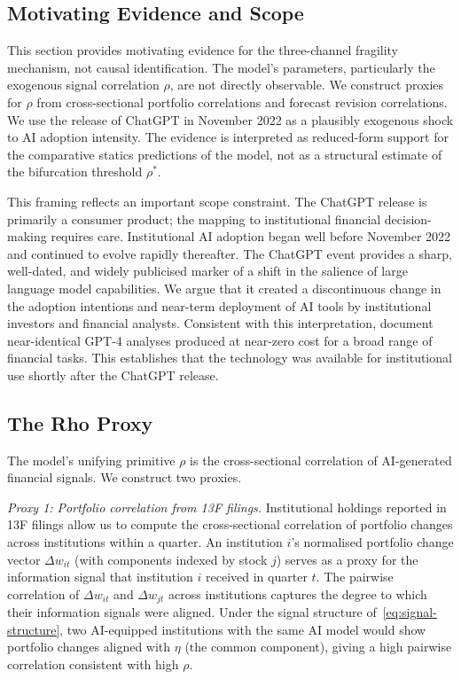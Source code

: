 \label{sec:empirics}

\subsection{Motivating Evidence and Scope}

This section provides motivating evidence for the three-channel fragility mechanism, not causal identification. The model's parameters, particularly the exogenous signal correlation $\rho$, are not directly observable. We construct proxies for $\rho$ from cross-sectional portfolio correlations and forecast revision correlations. We use the release of ChatGPT in November 2022 as a plausibly exogenous shock to AI adoption intensity. The evidence is interpreted as reduced-form support for the comparative statics predictions of the model, not as a structural estimate of the bifurcation threshold $\rho^*$.

This framing reflects an important scope constraint. The ChatGPT release is primarily a consumer product; the mapping to institutional financial decision-making requires care. Institutional AI adoption began well before November 2022 and continued to evolve rapidly thereafter. The ChatGPT event provides a sharp, well-dated, and widely publicised marker of a shift in the salience of large language model capabilities. We argue that it created a discontinuous change in the adoption intentions and near-term deployment of AI tools by institutional investors and financial analysts. Consistent with this interpretation, \citet{kim2024} document near-identical GPT-4 analyses produced at near-zero cost for a broad range of financial tasks. This establishes that the technology was available for institutional use shortly after the ChatGPT release.

\subsection{The Rho Proxy}

The model's unifying primitive $\rho$ is the cross-sectional correlation of AI-generated financial signals. We construct two proxies.

\emph{Proxy 1: Portfolio correlation from 13F filings.} Institutional holdings reported in 13F filings allow us to compute the cross-sectional correlation of portfolio changes across institutions within a quarter. An institution $i$'s normalised portfolio change vector $\Delta w_{it}$ (with components indexed by stock $j$) serves as a proxy for the information signal that institution $i$ received in quarter $t$. The pairwise correlation of $\Delta w_{it}$ and $\Delta w_{jt}$ across institutions captures the degree to which their information signals were aligned. Under the signal structure of~\eqref{eq:signal-structure}, two AI-equipped institutions with the same AI model would show portfolio changes aligned with $\eta$ (the common component), giving a high pairwise correlation consistent with high $\rho$.

